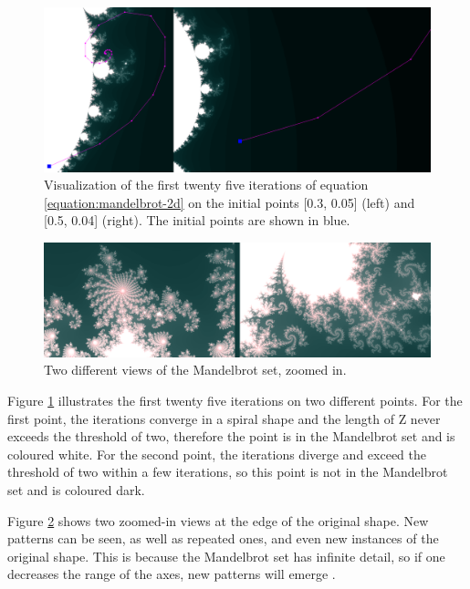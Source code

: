 \newpage

\begin{figure} [ht]
	\centering
	\includegraphics[width=\linewidth, frame]{Images/Mandelbrot-2D-Iterations.png}
	\caption{Visualization of the first twenty five iterations of equation \ref{equation:mandelbrot-2d} on the initial points [0.3, 0.05] (left) and [0.5, 0.04] (right). The initial points are shown in blue.}
	\label{figure:mandelbrot-2d-iterations}
\end{figure}

\begin{figure} [ht]
	\centering
	\includegraphics[width=\linewidth, frame]{Images/Mandelbrot-2D-Zoom.png}
	\caption{Two different views of the Mandelbrot set, zoomed in.}
	\label{figure:mandelbrot-2d-zoom}
\end{figure}

Figure \ref{figure:mandelbrot-2d-iterations} illustrates the first twenty five iterations on two different points. For the first point, the iterations converge in a spiral shape and the length of Z never exceeds the threshold of two, therefore the point is in the Mandelbrot set and is coloured white. For the second point, the iterations diverge and exceed the threshold of two within a few iterations, so this point is not in the Mandelbrot set and is coloured dark.\newline

Figure \ref{figure:mandelbrot-2d-zoom} shows two zoomed-in views at the edge of the original shape. New patterns can be seen, as well as repeated ones, and even new instances of the original shape. This is because the Mandelbrot set has infinite detail, so if one decreases the range of the axes, new patterns will emerge \cite{ashlock2006evolutionary}.\newline

